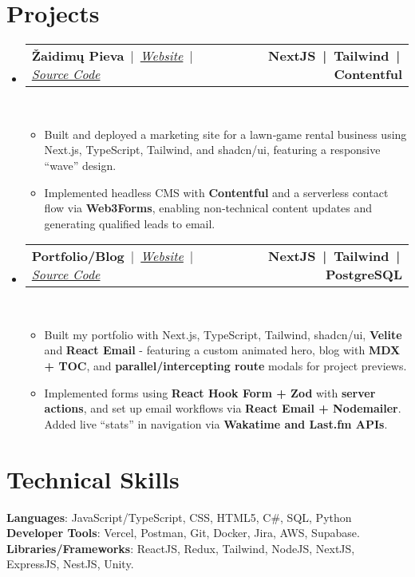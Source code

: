 \documentclass[letterpaper,11pt]{article}
\makeatletter
\newcommand{\resumeItem}[1]{
  \item\small{
    {#1 \vspace{0pt}}
  }
}
\newcommand{\resumeProjectHeading}[2]{
    \item
    \begin{tabular*}{1.001\textwidth}{l@{\extracolsep{\fill}}r}
      \small#1 & \textbf{\small #2}\\
    \end{tabular*}\vspace{-7pt}
}
\newcommand{\resumeSubHeadingListStart}{\begin{itemize}[leftmargin=0.0in, label={}]}
\newcommand{\resumeSubHeadingListEnd}{\end{itemize}}\vspace{0pt}
\newcommand{\resumeItemListStart}{\begin{itemize}}
\newcommand{\resumeItemListEnd}{\end{itemize}\vspace{-5pt}}
\makeatother
\begin{document}
\section{Projects} 
    \vspace{-5pt}
    \resumeSubHeadingListStart
    \resumeProjectHeading
            {\textbf{Žaidimų Pieva} \,|\, \emph{\href{https://zaidimu-pieva.vercel.app/}{Website}} \,|\, \emph{\href{https://github.com/AuJezus/zaidimu-pieva}{Source Code}}}{NextJS \,|\, Tailwind \,|\, Contentful}
            \\[5mm]
          \resumeItemListStart
            \resumeItem{Built and deployed a marketing site for a lawn‑game rental business using Next.js, TypeScript, Tailwind, and shadcn/ui, featuring a responsive “wave” design.}
            \resumeItem{Implemented headless CMS with \textbf{Contentful} and a serverless contact flow via \textbf{Web3Forms}, enabling non‑technical content updates and generating qualified leads to email.}
          \resumeItemListEnd
 \vspace{-20pt}
 \resumeProjectHeading
            {\textbf{Portfolio/Blog} \,|\, \emph{\href{https://www.aujezus.com/}{Website}} \,|\, \emph{\href{https://github.com/AuJezus/personal-website-v3}{Source Code}}}{NextJS \,|\, Tailwind \,|\, PostgreSQL}
            \\[5mm]
          \resumeItemListStart
            \resumeItem{Built my portfolio with Next.js, TypeScript, Tailwind, shadcn/ui, \textbf{Velite} and \textbf{React Email} - featuring a custom animated hero, blog with \textbf{MDX + TOC}, and \textbf{parallel/intercepting route} modals for project previews.}
            \resumeItem{Implemented forms using \textbf{React Hook Form + Zod} with \textbf{server actions}, and set up email workflows via \textbf{React Email + Nodemailer}. Added live “stats” in navigation via \textbf{Wakatime and Last.fm APIs}.}
          \resumeItemListEnd
\resumeSubHeadingListEnd
\vspace{-12pt}

\section{Technical Skills}
 \begin{itemize}[leftmargin=0.15in, label={}]
    \small{\item{   
     \textbf{Languages}{: JavaScript/TypeScript, CSS, HTML5, C\#, SQL, Python} \\[1mm]
     \textbf{Developer Tools}{: Vercel, Postman, Git, Docker, Jira, AWS, Supabase.} \\[1mm]
     \textbf{Libraries/Frameworks}{: ReactJS, Redux, Tailwind, NodeJS, NextJS, ExpressJS, NestJS, Unity.} \\ [1mm]
    }}
 \end{itemize}

\vspace{-18pt}
\end{document}
